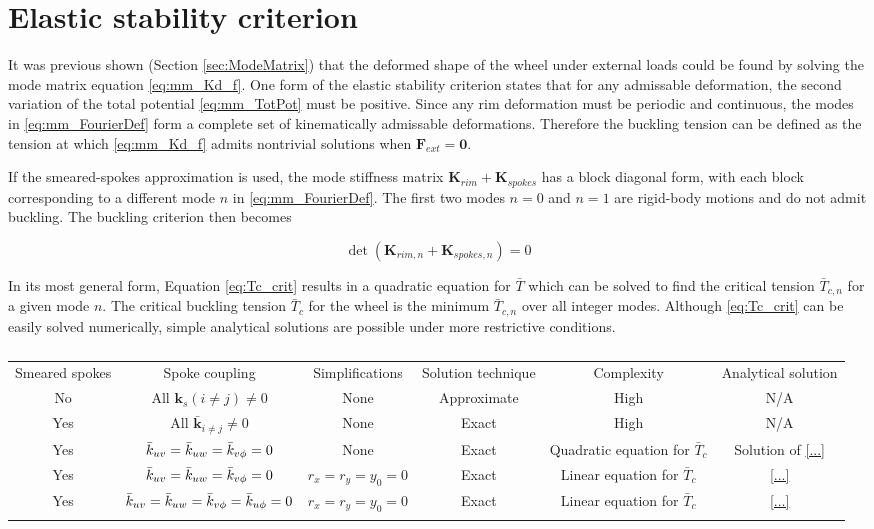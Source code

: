 \documentclass[\rootdir/thesis.tex]{subfiles}
\begin{document}
\section{Elastic stability criterion}
It was previous shown (Section \ref{sec:ModeMatrix}) that the deformed shape of the wheel under external loads could be found by solving the mode matrix equation \eqref{eq:mm_Kd_f}. One form of the elastic stability criterion states that for any admissable deformation, the second variation of the total potential \eqref{eq:mm_TotPot} must be positive. Since any rim deformation must be periodic and continuous, the modes in \eqref{eq:mm_FourierDef} form a complete set of kinematically admissable deformations. Therefore the buckling tension can be defined as the tension at which \eqref{eq:mm_Kd_f} admits nontrivial solutions when $\mathbf{F}_{ext}=\mathbf{0}.$

If the smeared-spokes approximation is used, the mode stiffness matrix $\mathbf{K}_{rim} + \mathbf{K}_{spokes}$ has a block diagonal form, with each block corresponding to a different mode $n$ in \eqref{eq:mm_FourierDef}. The first two modes $n=0$ and $n=1$ are rigid-body motions and do not admit buckling. The buckling criterion then becomes

\begin{equation}
\label{eq:Tc_crit}
\det{(\mathbf{K}_{rim, n} + \mathbf{K}_{spokes, n})} = 0
\end{equation}

In its most general form, Equation \eqref{eq:Tc_crit} results in a quadratic equation for $\bar{T}$ which can be solved to find the critical tension $\bar{T}_{c,n}$ for a given mode $n$. The critical buckling tension $\bar{T}_c$ for the wheel is the minimum $\bar{T}_{c,n}$ over all integer modes. Although \eqref{eq:Tc_crit} can be easily solved numerically, simple analytical solutions are possible under more restrictive conditions.

\begin{table}[h]
\caption{}
\label{tab:BucklingSolutions}
\begin{tabular}{cccccc}
\hline\noalign{\smallskip}
Smeared spokes & Spoke coupling & Simplifications & Solution technique & Complexity & Analytical solution\\
\noalign{\smallskip}\hline\noalign{\smallskip}
No  & All $\mathbf{k}_s(i\neq j) \neq 0$ & None & Approximate & High & N/A\\
Yes & All $\mathbf{\bar{k}}_{i\neq j} \neq 0$ & None & Exact & High & N/A\\
Yes & $\bar{k}_{uv}=\bar{k}_{uw}=\bar{k}_{v\phi} = 0$ & None & Exact & Quadratic equation for $\bar{T}_c$ & Solution of \eqref{...}\\
Yes & $\bar{k}_{uv}=\bar{k}_{uw}=\bar{k}_{v\phi} = 0$ & $r_x=r_y=y_0=0$ & Exact & Linear equation for $\bar{T}_c$ & \eqref{...}\\
Yes & $\bar{k}_{uv}=\bar{k}_{uw}=\bar{k}_{v\phi}=\bar{k}_{u\phi} = 0$ & $r_x=r_y=y_0=0$ & Exact & Linear equation for $\bar{T}_c$ & \eqref{...}\\
\noalign{\smallskip}\hline
\end{tabular}
\end{table}
\end{document}
